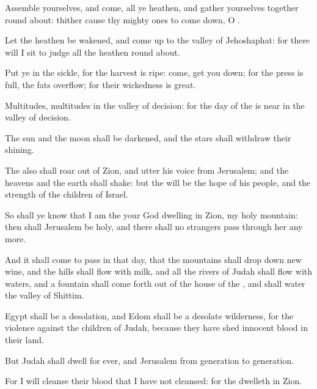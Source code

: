 \Verse Assemble yourselves, and come, all ye heathen, and gather yourselves together round about: thither cause thy mighty ones to come down, O \LORD.

\Verse Let the heathen be wakened, and come up to the valley of Jehoshaphat: for there will I sit to judge all the heathen round about.

\Verse Put ye in the sickle, for the harvest is ripe: come, get you down; for the press is full, the fats overflow; for their wickedness is great.

\Verse Multitudes, multitudes in the valley of decision: for the day of the \LORD is near in the valley of decision.

\Verse The sun and the moon shall be darkened, and the stars shall withdraw their shining.

\Verse The \LORD also shall roar out of Zion, and utter his voice from Jerusalem; and the heavens and the earth shall shake: but the \LORD will be the hope of his people, and the strength of the children of Israel.

\Verse So shall ye know that I am the \LORD your God dwelling in Zion, my holy mountain: then shall Jerusalem be holy, and there shall no strangers pass through her any more.

\Verse And it shall come to pass in that day, that the mountains shall drop down new wine, and the hills shall flow with milk, and all the rivers of Judah shall flow with waters, and a fountain shall come forth out of the house of the \LORD, and shall water the valley of Shittim.

\Verse Egypt shall be a desolation, and Edom shall be a desolate wilderness, for the violence against the children of Judah, because they have shed innocent blood in their land.

\Verse But Judah shall dwell for ever, and Jerusalem from generation to generation.

\Verse For I will cleanse their blood that I have not cleansed: for the \LORD dwelleth in Zion.

